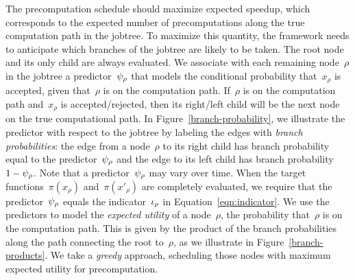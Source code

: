 \documentclass[angelino.tex]{subfiles}
\begin{document}
The precomputation schedule should maximize expected speedup, which corresponds
to the expected number of precomputations along the true computation path
in the jobtree.
%
To maximize this quantity, the framework needs to anticipate which branches
of the jobtree are likely to be taken.
%
The root node and its only child are always evaluated.
%
We associate with each remaining node~$\rho$ in the jobtree a 
predictor~$\psi_{\rho}$ that models the conditional probability
that~$x_\rho$ is accepted, given that~$\rho$ is on the computation path.
%
If~$\rho$ is on the computation path and~$x_\rho$ is accepted/rejected,
then its right/left child will be the next node on the true computational path.
%
In Figure~\ref{branch-probability}, we illustrate the predictor with respect to
the jobtree by labeling the edges with \emph{branch probabilities}:
the edge from a node~$\rho$ to its right child has branch probability equal to
the predictor~$\psi_{\rho}$ and the edge to its left child has
branch probability~${1 - \psi_{\rho}}$.
%
Note that a predictor~$\psi_{\rho}$ may vary over time.
%
When the target functions~$\pi(x_\rho)$ and~$\pi(x'_\rho)$ are completely
evaluated, we require that the predictor~$\psi_{\rho}$
equals the indicator~$\iota_{\rho}$ in Equation~\ref{eqn:indicator}.
%
We use the predictors to model the \emph{expected utility} of a node~$\rho$,
\ie the probability that~$\rho$ is on the computation path.
%
This is given by the product of the branch probabilities along the path
connecting the root to~$\rho$, as we illustrate in Figure~\ref{branch-products}.
%
We take a \emph{greedy} approach, scheduling those nodes with maximum expected
utility for precomputation.
\end{document}
